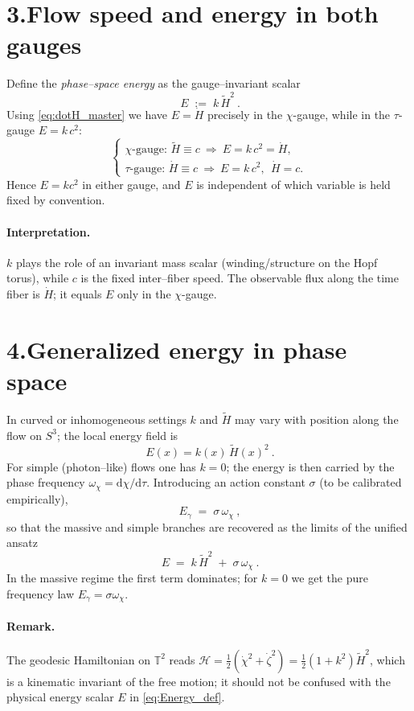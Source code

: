 \documentclass[12pt,a4paper]{article}
\newcommand{\tH}{\tilde{H}}
\newcommand{\dd}{\mathrm{d}}
\newcommand{\T}{\mathbb{T}}
\begin{document}
\section*{3.\;Flow speed and energy in both gauges}

Define the \emph{phase--space energy} as the gauge--invariant scalar
\begin{equation}\label{eq:Energy_def}
\boxed{\ E \;:=\; k\,\tH^2\ }.
\end{equation}
Using \eqref{eq:dotH_master} we have $E=\dot H$ precisely in the $\chi$-gauge, while in the $\tau$-gauge $E=k\,c^2$:
\[
\begin{cases}
\text{$\chi$-gauge: } \tH\equiv c \ \Rightarrow\ E=k\,c^2=\dot H,\\[1mm]
\text{$\tau$-gauge: } \dot H\equiv c \ \Rightarrow\ E=k\,c^2,\ \ \dot H=c.
\end{cases}
\]
Hence $E=kc^2$ in either gauge, and $E$ is independent of which variable is held fixed by convention.

\paragraph{Interpretation.}
$k$ plays the role of an invariant mass scalar (winding/structure on the Hopf torus), while $c$ is the fixed inter--fiber speed. The observable flux along the time fiber is $\dot H$; it equals $E$ only in the $\chi$-gauge.

\section*{4.\;Generalized energy in phase space}

In curved or inhomogeneous settings $k$ and $\tH$ may vary with position along the flow on $S^3$; the local energy field is
\begin{equation}\label{eq:E_field}
\boxed{\ E(x)=k(x)\,\tH(x)^2\ }.
\end{equation}
For simple (photon--like) flows one has $k=0$; the energy is then carried by the phase frequency $\omega_\chi=\dd\chi/\dd\tau$. Introducing an action constant $\sigma$ (to be calibrated empirically),
\begin{equation}\label{eq:photon_branch}
\boxed{\ E_\gamma \;=\; \sigma\,\omega_\chi \ },
\end{equation}
so that the massive and simple branches are recovered as the limits of the unified ansatz
\begin{equation}\label{eq:unified_energy}
\boxed{\ E \;=\; k\,\tH^2 \;+\; \sigma\,\omega_\chi \ }.
\end{equation}
In the massive regime the first term dominates; for $k=0$ we get the pure frequency law $E_\gamma=\sigma\omega_\chi$.

\paragraph{Remark.}
The geodesic Hamiltonian on $\T^2$ reads $\mathscr{H}=\tfrac12(\dot\chi^2+\dot\zeta^2)=\tfrac12(1+k^2)\tH^2$, which is a kinematic invariant of the free motion; it should not be confused with the physical energy scalar $E$ in \eqref{eq:Energy_def}.
\end{document}
